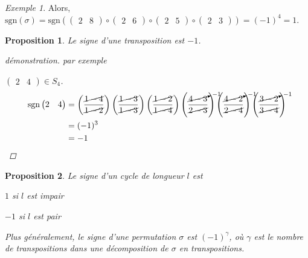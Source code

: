 \documentclass{report}
\newtheorem*{prop}{Proposition}
\theoremstyle{definition}
\theoremstyle{remark}
\newtheorem*{exem}{Exemple}
\begin{document}
\begin{exem}
		Alors, $\mathrm{sgn}(\sigma) = \mathrm{sgn}\left( \begin{pmatrix}
			2&8
		\end{pmatrix} \circ \begin{pmatrix}
			2&6
		\end{pmatrix} \circ \begin{pmatrix}
			2&5
		\end{pmatrix} \circ \begin{pmatrix}
			2&3
		\end{pmatrix} \right) = (-1)^4 = 1$.
	\end{exem}
	\begin{prop}
		Le signe d'une transposition est $-1$.
		\begin{proof}[d\'emonstration]
			par exemple

			$\begin{pmatrix}
				2&4
			\end{pmatrix} \in S_4$.
			\begin{align*}
				\mathrm{sgn}\begin{pmatrix}
					2&4
				\end{pmatrix}&= \left( \dfrac{\cancel{1-4}}{\cancel{1-2}} \right) \left( \dfrac{\cancel{1-3}}{\cancel{1-3}} \right) \left( \dfrac{\cancel{1-2}}{\cancel{1-4}} \right) \left( \dfrac{\cancelto{-1}{4-3}}{\cancel{2-3}} \right) \left( \dfrac{\cancelto{-1}{4-2}}{\cancel{2-4}} \right) \left( \dfrac{\cancelto{-1}{3-2}}{\cancel{3-4}} \right)\\
				&= (-1)^3\\
				&= -1
			\end{align*}
			\renewcommand{\qedsymbol}{\#}
		\end{proof}
		\renewcommand{\qedsymbol}{$\square$}
	\end{prop}
	\begin{prop}
		Le signe d'un cycle de longueur $l$ est
		\begin{ulist}
			\item $1$ si $l$ est impair
			\item $-1$ si $l$ est pair
		\end{ulist}

		Plus g\'en\'eralement, le signe d'une permutation $\sigma$ est $(-1)^\gamma$, o\`u $\gamma$ est le nombre de transpositions dans \emph{une} d\'ecomposition de $\sigma$ en transpositions.
	\end{prop}
\end{document}

